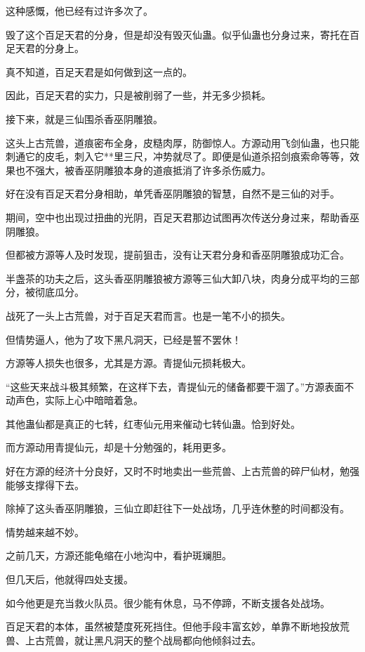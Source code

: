 \begin{this_body}
这种感慨，他已经有过许多次了。

毁了这个百足天君的分身，但是却没有毁灭仙蛊。似乎仙蛊也分身过来，寄托在百足天君的分身上。

真不知道，百足天君是如何做到这一点的。

因此，百足天君的实力，只是被削弱了一些，并无多少损耗。

接下来，就是三仙围杀香巫阴雕狼。

这头上古荒兽，道痕密布全身，皮糙肉厚，防御惊人。方源动用飞剑仙蛊，也只能刺通它的皮毛，刺入它**里三尺，冲势就尽了。即便是仙道杀招剑痕索命等等，效果也不强大，被香巫阴雕狼本身的道痕抵消了许多杀伤威力。

好在没有百足天君分身相助，单凭香巫阴雕狼的智慧，自然不是三仙的对手。

期间，空中也出现过扭曲的光阴，百足天君那边试图再次传送分身过来，帮助香巫阴雕狼。

但都被方源等人及时发现，提前狙击，没有让天君分身和香巫阴雕狼成功汇合。

半盏茶的功夫之后，这头香巫阴雕狼被方源等三仙大卸八块，肉身分成平均的三部分，被彻底瓜分。

战死了一头上古荒兽，对于百足天君而言。也是一笔不小的损失。

但情势逼人，他为了攻下黑凡洞天，已经是誓不罢休！

方源等人损失也很多，尤其是方源。青提仙元损耗极大。

“这些天来战斗极其频繁，在这样下去，青提仙元的储备都要干涸了。”方源表面不动声色，实际上心中暗暗着急。

其他蛊仙都是真正的七转，红枣仙元用来催动七转仙蛊。恰到好处。

而方源动用青提仙元，却是十分勉强的，耗用更多。

好在方源的经济十分良好，又时不时地卖出一些荒兽、上古荒兽的碎尸仙材，勉强能够支撑得下去。

除掉了这头香巫阴雕狼，三仙立即赶往下一处战场，几乎连休整的时间都没有。

情势越来越不妙。

之前几天，方源还能龟缩在小地沟中，看护斑斓胆。

但几天后，他就得四处支援。

如今他更是充当救火队员。很少能有休息，马不停蹄，不断支援各处战场。

百足天君的本体，虽然被楚度死死挡住。但他手段丰富玄妙，单靠不断地投放荒兽、上古荒兽，就让黑凡洞天的整个战局都向他倾斜过去。


\end{this_body}
